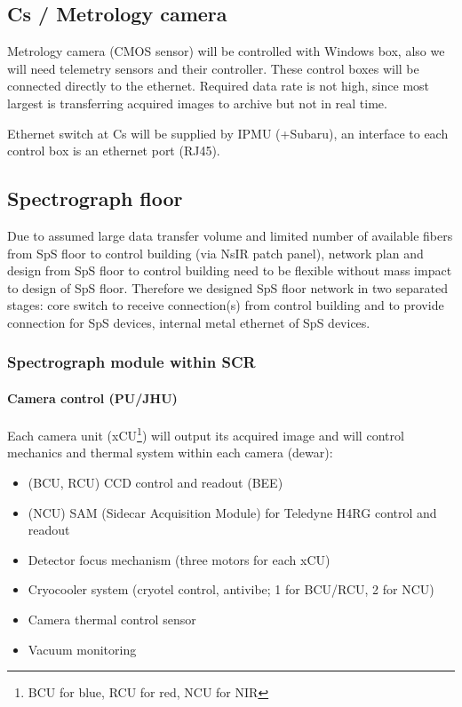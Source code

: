 \documentclass[a4paper,notitlepage]{article}
\begin{document}
\subsection{Cs / Metrology camera}

Metrology camera (CMOS sensor) will be controlled with Windows box, 
also we will need telemetry sensors and their controller. 
These control boxes will be connected directly to the ethernet. 
Required data rate is not high, since most largest is transferring acquired 
images to archive but not in real time. 

Ethernet switch at Cs will be supplied by IPMU (+Subaru), an interface to 
each control box is an ethernet port (RJ45). 

\subsection{Spectrograph floor}

Due to assumed large data transfer volume and limited number of available 
fibers from SpS floor to control building (via NsIR patch panel), 
network plan and design from SpS floor to control building need to be 
flexible without mass impact to design of SpS floor. 
Therefore we designed SpS floor network in two separated stages: core switch 
to receive connection(s) from control building and to provide connection 
for SpS devices, internal metal ethernet of SpS devices. 

\subsubsection{Spectrograph module within SCR}

\paragraph{Camera control (PU/JHU)}

Each camera unit (xCU\footnote{BCU for blue, RCU for red, NCU for NIR}) 
will output its acquired image and will control 
mechanics and thermal system within each camera (dewar): 

\begin{itemize}
  \item (BCU, RCU) CCD control and readout (BEE)
  \item (NCU) SAM (Sidecar Acquisition Module) for Teledyne H4RG control and readout
  \item Detector focus mechanism (three motors for each xCU)
  \item Cryocooler system (cryotel control, antivibe; 1 for BCU/RCU, 2 for NCU)
  \item Camera thermal control sensor
  \item Vacuum monitoring
\end{itemize}
\end{document}
